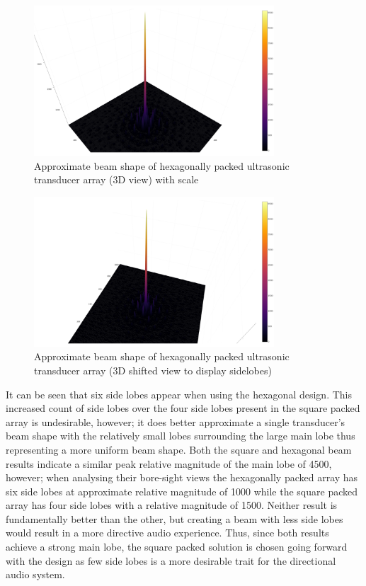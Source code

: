 \begin{figure}[ht!]
    \centering
    \includegraphics[width=0.8\textwidth]{Figures/arraySim/hex/beampat3dplaneview.png}
    \caption{Approximate beam shape of hexagonally packed ultrasonic transducer array (3D view) with scale}
    \label{fig:hex_elem_3Dbeamscale}
\end{figure}

\begin{figure}[ht!]
    \centering
    \includegraphics[width=0.8\textwidth]{Figures/arraySim/hex/beampat3d.png}
    \caption{Approximate beam shape of hexagonally packed ultrasonic transducer array (3D shifted view to display sidelobes)}
    \label{fig:hex_elem_3Dbeam}
\end{figure}

\newpage
It can be seen that six side lobes appear when using the hexagonal design. This increased count of side lobes over the four side lobes present in the square packed array is undesirable, however; it does better approximate a single transducer's beam shape with the relatively small lobes surrounding the large main lobe thus representing a more uniform beam shape.
Both the square and hexagonal beam results indicate a similar peak relative magnitude of the main lobe of 4500, however; when analysing their bore-sight views the hexagonally packed array has six side lobes at approximate relative magnitude of 1000 while the square packed array has four side lobes with a relative magnitude of 1500. Neither result is fundamentally better than the other, but creating a beam with less side lobes would result in a more directive audio experience. Thus, since both results achieve a strong main lobe, the square packed solution is chosen going forward with the design as few side lobes is a more desirable trait for the directional audio system.

